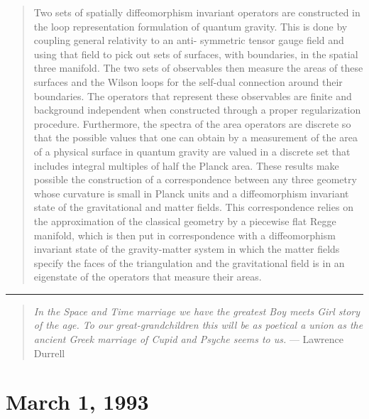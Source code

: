 \documentclass{article}
\def\tightlist{}
\renewcommand{\texttt}[1]{%
  \begingroup
  \ttfamily
  \begingroup\lccode`~=`/\lowercase{\endgroup\def~}{/\discretionary{}{}{}}%
  \begingroup\lccode`~=`[\lowercase{\endgroup\def~}{[\discretionary{}{}{}}%
  \begingroup\lccode`~=`.\lowercase{\endgroup\def~}{.\discretionary{}{}{}}%
  \catcode`/=\active\catcode`[=\active\catcode`.=\active
  \scantokens{#1\noexpand}%
  \endgroup
}
\begin{document}
\begin{quote}
Two sets of spatially diffeomorphism invariant operators are constructed
in the loop representation formulation of quantum gravity. This is done
by coupling general relativity to an anti- symmetric tensor gauge field
and using that field to pick out sets of surfaces, with boundaries, in
the spatial three manifold. The two sets of observables then measure the
areas of these surfaces and the Wilson loops for the self-dual
connection around their boundaries. The operators that represent these
observables are finite and background independent when constructed
through a proper regularization procedure. Furthermore, the spectra of
the area operators are discrete so that the possible values that one can
obtain by a measurement of the area of a physical surface in quantum
gravity are valued in a discrete set that includes integral multiples of
half the Planck area. These results make possible the construction of a
correspondence between any three geometry whose curvature is small in
Planck units and a diffeomorphism invariant state of the gravitational
and matter fields. This correspondence relies on the approximation of
the classical geometry by a piecewise flat Regge manifold, which is then
put in correspondence with a diffeomorphism invariant state of the
gravity-matter system in which the matter fields specify the faces of
the triangulation and the gravitational field is in an eigenstate of the
operators that measure their areas.
\end{quote}

\begin{center}\rule{0.5\linewidth}{0.5pt}\end{center}

\begin{quote}
\emph{In the Space and Time marriage we have the greatest Boy meets Girl
story of the age. To our great-grandchildren this will be as poetical a
union as the ancient Greek marriage of Cupid and Psyche seems to us.}
--- Lawrence Durrell
\end{quote}
\hypertarget{week7}{%
\section{March 1, 1993}\label{week7}}

\end{document}
